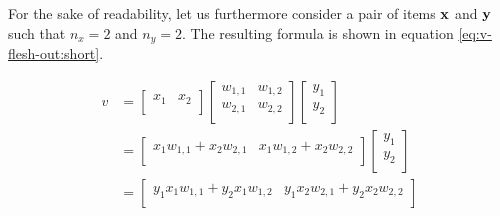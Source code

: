 For the sake of readability, let us furthermore consider a pair of items $\boldsymbol{\mathbf{x}}$ and $\boldsymbol{\mathbf{y}}$ such that $n_x = 2$ and $n_y = 2$. The resulting formula is shown in equation \ref{eq:v-flesh-out:short}.

\begin{equation} \label{eq:v-flesh-out:short}
    \begin{split} 
        v &= 
            \begin{bmatrix}
                x_{1} & x_{2} \\
            \end{bmatrix}
            \begin{bmatrix}
                w_{1,1} & w_{1,2} \\
                w_{2,1} & w_{2,2} \\
            \end{bmatrix}
            \begin{bmatrix}
                y_{1} \\
                y_{2} \\
            \end{bmatrix} \\
        &=
            \begin{bmatrix}
                x_{1}w_{1,1} + x_{2}w_{2,1} & x_{1}w_{1,2} + x_{2}w_{2,2} \\
            \end{bmatrix}    
            \begin{bmatrix}
                y_{1} \\
                y_{2} \\
            \end{bmatrix} \\
        &=
            \begin{bmatrix}
                y_{1}x_{1}w_{1,1} + y_{2}x_{1}w_{1,2} & y_{1}x_{2}w_{2,1} + y_{2}x_{2}w_{2,2} \\
            \end{bmatrix} \\
    \end{split}
\end{equation}


